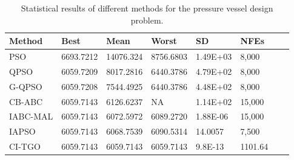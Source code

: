 
\begin{table*}[tp]
    \tiny
    \begin{center}
    
    \begin{tabular}{ P{2.0cm} P{2.0cm} P{2.0cm} P{2.0cm} P{2.0cm} P{2.0cm} P{2.0cm} P{2.0cm}  }
    \hline
    \textbf{Method} & \textbf{Best} & \textbf{Mean} & \textbf{Worst} & \textbf{SD} & \textbf{NFEs} \\
    \hline
    
    PSO & 6693.7212 & 14076.324 & 8756.6803 & 1.49E+03 & 8,000 \\
    QPSO & 6059.7209 & 8017.2816 & 6440.3786 & 4.79E+02 & 8,000 \\
    G-QPSO & 6059.7208 & 7544.4925 & 6440.3786 & 4.48E+02 & 8,000 \\
    CB-ABC & 6059.7143 & 6126.6237 & NA & 1.14E+02 & 15,000 \\
    IABC-MAL & 6059.7143 & 6072.5972 & 6089.2720 & 1.88E-06 & 15,000 \\
    IAPSO & 6059.7143 & 6068.7539 & 6090.5314 & 14.0057 & 7,500 \\
    CI-TGO & 6059.7143 & 6059.7143 & 6059.7143 & 9.8E-13 & 1101.64 \\
    
    \hline
    \end{tabular}
    \end{center}
    
    \caption{ Statistical results of different methods for the pressure vessel design problem. \\[1em]}
    \label{tab:PV}
    \end{table*}
    
    
